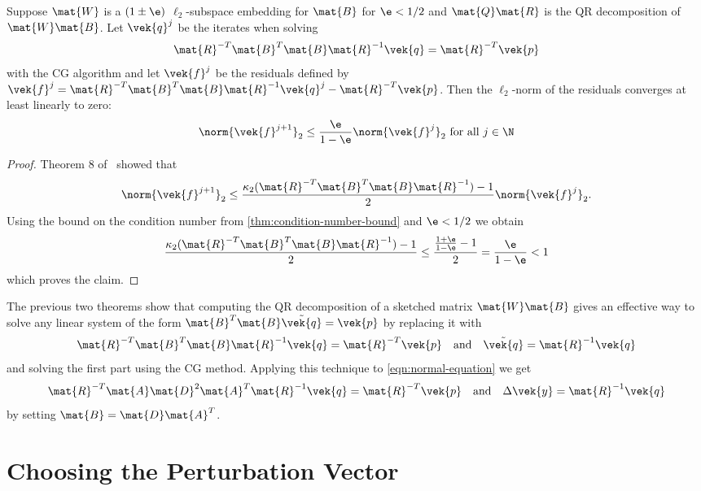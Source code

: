 \begin{lemma}\label{thm:cg-residual-bound}
Suppose \(\mat{W}\) is a \((1\pm\e)\) \(\ell_2\)-subspace embedding for \(\mat{B}\) for \(\e < 1/2\) and \(\mat{Q}\mat{R}\) is the QR decomposition of \(\mat{W}\mat{B}\).
Let \(\vek{q}^j\) be the iterates when solving \[ \mat{R}^{-T} \mat{B}^T \mat{B} \mat{R}^{-1} \vek{q} = \mat{R}^{-T} \vek{p} \] with the CG algorithm and let \(\vek{f}^j\) be the residuals defined by
\( \vek{f}^j = \mat{R}^{-T} \mat{B}^T \mat{B} \mat{R}^{-1} \vek{q}^j - \mat{R}^{-T} \vek{p} \).
Then the \(\ell_2\)-norm of the residuals converges at least linearly to zero:
\[ \norm{\vek{f}^{j+1}}_2 \leq \frac{\e}{1-\e} \norm{ \vek{f}^j }_2 \text{ for all } j \in \N \]
\end{lemma}
\begin{proof}
Theorem 8 of~\cite{Bouyouli-ConjugateGradientConvergence} showed that
\[ \norm{\vek{f}^{j+1}}_2 \leq \frac{\kappa_2(\mat{R}^{-T} \mat{B}^T \mat{B} \mat{R}^{-1}) - 1}{2} \norm{\vek{f}^j}_2 .\]
Using the bound on the condition number from \cref{thm:condition-number-bound} and \(\e < 1/2\) we obtain
\[ \frac{\kappa_2(\mat{R}^{-T} \mat{B}^T \mat{B} \mat{R}^{-1}) - 1}{2}
   \leq \frac{\frac{1 + \e}{1 - \e} - 1}{2} = \frac{\e}{1-\e} < 1 \]
which proves the claim.
\end{proof}

The previous two theorems show that computing the QR decomposition of a sketched matrix \(\mat{W}\mat{B}\) gives an effective way to solve any linear system of the form
\( \mat{B}^T \mat{B}\tilde{\vek{q}} = \vek{p} \)
by replacing it with
\begin{equation}\label{eqn:general-preconditioned-linear-system}
  \mat{R}^{-T}\mat{B}^T\mat{B}\mat{R}^{-1}\vek{q} = \mat{R}^{-T}\vek{p} \quad \text{and} \quad \tilde{\vek{q}} = \mat{R}^{-1}\vek{q}
\end{equation}
and solving the first part using the CG method.
Applying this technique to \cref{eqn:normal-equation} we get
\begin{equation}\label{eqn:preconditioned-normal-equation}
  \mat{R}^{-T}\mat{A}\mat{D}^2\mat{A}^T\mat{R}^{-1}\vek{q} = \mat{R}^{-T}\vek{p} \quad \text{and} \quad \Delta\vek{y} = \mat{R}^{-1}\vek{q}
\end{equation}
by setting \(\mat{B} = \mat{D}\mat{A}^T\).

\section{Choosing the Perturbation Vector}\label{sec:sektching-perturbation-vector}

